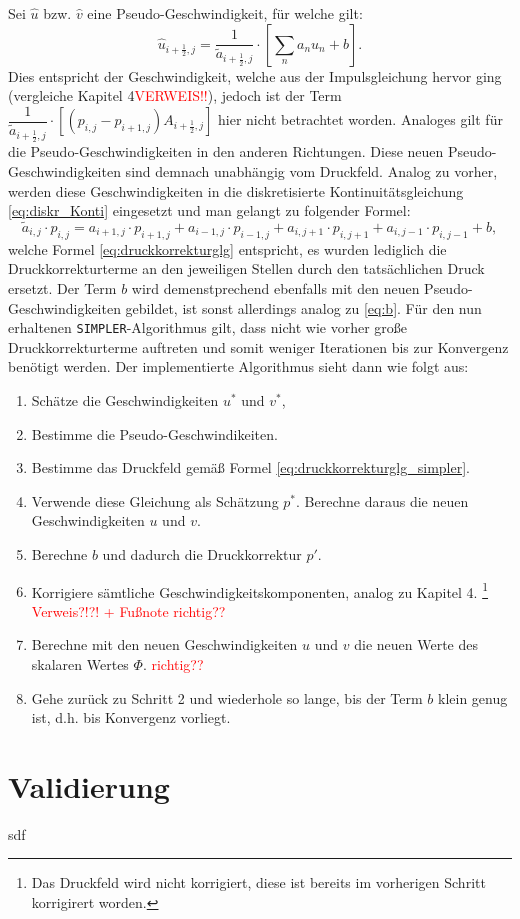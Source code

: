 Sei $\hat{u}$ bzw. $\hat{v}$ eine Pseudo-Geschwindigkeit, f\"ur welche gilt:
\begin{equation} \label{eq:pseudo_geschw}
\hat{u}_{i+\frac{1}{2},j}=\dfrac{1}{\tilde{a}_{i+\frac{1}{2},j}}\cdot\left[\sum\limits_{n}a_{n}u_{n}+b\right].
\end{equation}
Dies entspricht der Geschwindigkeit, welche aus der Impulsgleichung hervor ging (vergleiche Kapitel 4\textcolor{red}{VERWEIS!!}), jedoch ist der Term $\dfrac{1}{\tilde{a}_{i+\frac{1}{2},j}}\cdot\left[\left(p_{i,j}-p_{i+1,j}\right)A_{i+\frac{1}{2},j}\right]$ hier nicht betrachtet worden. Analoges gilt f\"ur die Pseudo-Geschwindigkeiten in den anderen Richtungen. Diese neuen Pseudo-Geschwindigkeiten sind demnach unabh\"angig vom Druckfeld. Analog zu vorher, werden diese Geschwindigkeiten in die diskretisierte Kontinuit\"atsgleichung \eqref{eq:diskr_Konti} eingesetzt und man gelangt zu folgender Formel:
\begin{equation} \label{eq:druckkorrekturglg_simpler}
\tilde{a}_{i,j}\cdot p_{i,j} = a_{i+1,j}\cdot p_{i+1,j}+a_{i-1,j}\cdot p_{i-1,j}+a_{i,j+1}\cdot p_{i,j+1}+a_{i,j-1}\cdot p_{i,j-1}+b,
\end{equation}
welche Formel \eqref{eq:druckkorrekturglg} entspricht, es wurden lediglich die Druckkorrekturterme an den jeweiligen Stellen durch den tats\"achlichen Druck ersetzt. Der Term $b$ wird demenstprechend ebenfalls mit den neuen Pseudo-Geschwindigkeiten gebildet, ist sonst allerdings analog zu \eqref{eq:b}. F\"ur den nun erhaltenen \texttt{SIMPLER}-Algorithmus gilt, dass nicht wie vorher gro\ss{}e Druckkorrekturterme auftreten und somit weniger Iterationen bis zur Konvergenz ben\"otigt werden. Der implementierte Algorithmus sieht dann wie folgt aus:
\begin{enumerate}
\item Sch\"atze die Geschwindigkeiten $u^{*}$ und $v^{*}$,
\item Bestimme die Pseudo-Geschwindikeiten.
\item Bestimme das Druckfeld gem\"a\ss{} Formel \eqref{eq:druckkorrekturglg_simpler}.
\item Verwende diese Gleichung als Sch\"atzung $p^{*}$. Berechne daraus die neuen Geschwindigkeiten $u$ und $v$.
\item Berechne $b$ und dadurch die Druckkorrektur $p'$.
\item Korrigiere s\"amtliche Geschwindigkeitskomponenten, analog zu Kapitel 4. \footnote{Das Druckfeld wird nicht korrigiert, diese ist bereits im vorherigen Schritt korrigirert worden.} \textcolor{red}{Verweis?!?! + Fu\ss{}note richtig??}
\item Berechne mit den neuen Geschwindigkeiten $u$ und $v$ die neuen Werte des skalaren Wertes $\Phi$.  \textcolor{red}{richtig??}
\item Gehe zur\"uck zu Schritt 2 und wiederhole so lange, bis der Term $b$ klein genug ist, d.h. bis Konvergenz vorliegt.
\end{enumerate}

\section{Validierung}
sdf